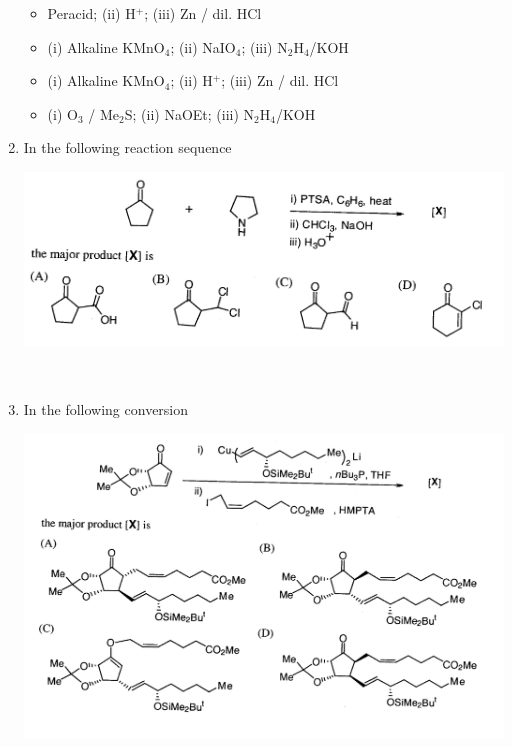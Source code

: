 \documentclass[journal,12pt,onecolumn]{IEEEtran}
\theoremstyle{remark}
\begin{document}
\begin{enumerate}
\begin{multicols}{2}
\begin{itemize}[label=(A)]
    \item Peracid; (ii) H$^+$; (iii) Zn / dil. HCl
    \item (i) Alkaline KMnO$_4$; (ii) NaIO$_4$; (iii) N$_2$H$_4$/KOH
    \item (i) Alkaline KMnO$_4$; (ii) H$^+$; (iii) Zn / dil. HCl
    \item (i) O$_3$ / Me$_2$S; (ii) NaOEt; (iii) N$_2$H$_4$/KOH
\end{itemize}
\end{multicols}


\item    \hspace{0.5cm} In the following reaction sequence  \hfill{}

\begin{center}
\includegraphics[width=\textwidth]{figs/image16.png}
\end{center}



 

\newpage
\

\item    \hspace{0.5cm} In the following conversion  \hfill{}

\begin{center}
\includegraphics[width=\textwidth]{figs/image17.png}
\end{center}
 




\end{enumerate}
\end{document}
